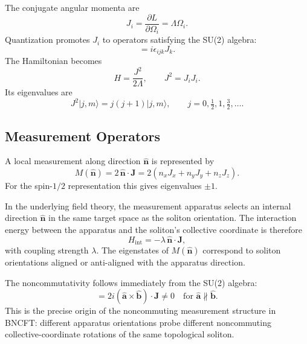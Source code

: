 ﻿\documentclass[11pt,a4paper]{article}
\begin{document}
The conjugate angular momenta are
\begin{equation}
J_i = \frac{\partial L}{\partial \Omega_i} = \Lambda \Omega_i.
\end{equation}
Quantization promotes $J_i$ to operators satisfying the SU(2) algebra:
\begin{equation}
[J_i,J_j] = i\epsilon_{ijk}J_k.
\end{equation}
The Hamiltonian becomes
\begin{equation}
H = \frac{J^2}{2\Lambda}, \qquad J^2 = J_i J_i.
\end{equation}
Its eigenvalues are
\begin{equation}
J^2 |j,m\rangle = j(j+1) |j,m\rangle, \qquad j = 0, \tfrac{1}{2}, 1, \tfrac{3}{2}, \ldots.
\end{equation}

\subsection{Measurement Operators}

A local measurement along direction $\hat{\mathbf{n}}$ is represented by
\begin{equation}
M(\hat{\mathbf{n}}) = 2\,\hat{\mathbf{n}}\cdot\mathbf{J} = 2(n_x J_x + n_y J_y + n_z J_z).
\end{equation}
For the spin-$1/2$ representation this gives eigenvalues $\pm1$.

In the underlying field theory, the measurement apparatus selects an internal direction $\hat{\mathbf{n}}$ in the same target space as the soliton orientation. The interaction energy between the apparatus and the soliton's collective coordinate is therefore
\begin{equation}
H_{\text{int}} = -\lambda\, \hat{\mathbf{n}}\cdot\mathbf{J},
\end{equation}
with coupling strength $\lambda$. The eigenstates of $M(\hat{\mathbf{n}})$ correspond to soliton orientations aligned or anti-aligned with the apparatus direction.

The noncommutativity follows immediately from the SU(2) algebra:
\begin{equation}
[M(\hat{\mathbf{a}}), M(\hat{\mathbf{b}})] = 2i(\hat{\mathbf{a}}\times\hat{\mathbf{b}})\cdot\mathbf{J} \neq 0 \quad \text{for } \hat{\mathbf{a}}\not\parallel\hat{\mathbf{b}}.
\end{equation}
This is the precise origin of the noncommuting measurement structure in BNCFT: different apparatus orientations probe different noncommuting collective-coordinate rotations of the same topological soliton.
\end{document}
